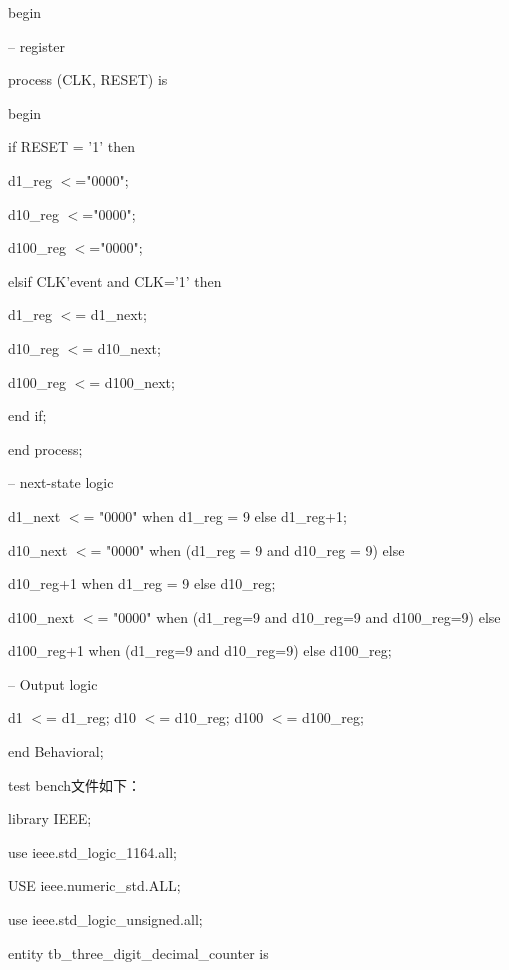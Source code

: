 \documentclass{article} %
\begin{document}
\noindent

\noindent begin

\noindent -- register

\noindent process (CLK, RESET) is

\noindent begin

\noindent     if RESET = '1' then

\noindent         d1\_reg $\mathrm{<}$="0000";

\noindent         d10\_reg $\mathrm{<}$="0000";

\noindent         d100\_reg $\mathrm{<}$="0000";

\noindent     elsif CLK'event and CLK='1' then

\noindent         d1\_reg $\mathrm{<}$= d1\_next;

\noindent         d10\_reg $\mathrm{<}$= d10\_next;

\noindent         d100\_reg $\mathrm{<}$= d100\_next;

\noindent     end if;

\noindent end process;

\noindent -- next-state logic

\noindent d1\_next $\mathrm{<}$= "0000" when d1\_reg = 9 else d1\_reg+1;

\noindent d10\_next $\mathrm{<}$= "0000" when (d1\_reg = 9 and d10\_reg = 9) else

\noindent             d10\_reg+1 when d1\_reg = 9 else d10\_reg;

\noindent d100\_next $\mathrm{<}$= "0000" when (d1\_reg=9 and d10\_reg=9 and d100\_reg=9) else

\noindent              d100\_reg+1 when (d1\_reg=9 and d10\_reg=9) else d100\_reg;

\noindent -- Output logic

\noindent d1 $\mathrm{<}$= d1\_reg; d10 $\mathrm{<}$= d10\_reg; d100 $\mathrm{<}$= d100\_reg;

\noindent end Behavioral;

test bench文件如下：

\noindent library IEEE;

\noindent use ieee.std\_logic\_1164.all;

\noindent USE ieee.numeric\_std.ALL;

\noindent use ieee.std\_logic\_unsigned.all;

\noindent

\noindent entity tb\_three\_digit\_decimal\_counter is
\end{document}
